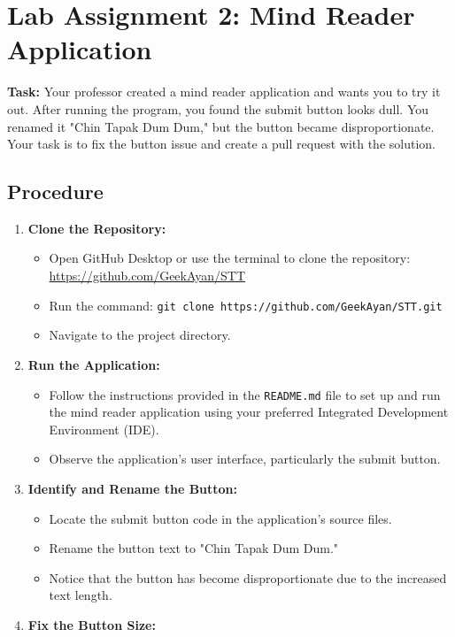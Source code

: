 \documentclass[a4paper,12pt]{article}
\begin{document}
\section{Lab Assignment 2: Mind Reader Application}

\textbf{Task:} Your professor created a mind reader application and wants you to try it out. After running the program, you found the submit button looks dull. You renamed it "Chin Tapak Dum Dum," but the button became disproportionate. Your task is to fix the button issue and create a pull request with the solution.

\subsection*{Procedure}
\begin{enumerate}[label=\arabic*.]
    \item \textbf{Clone the Repository:}
    \begin{itemize}
        \item Open GitHub Desktop or use the terminal to clone the repository: \url{https://github.com/GeekAyan/STT}
        \item Run the command: \texttt{git clone https://github.com/GeekAyan/STT.git}
        \item Navigate to the project directory.
    \end{itemize}
    \item \textbf{Run the Application:}
    \begin{itemize}
        \item Follow the instructions provided in the \texttt{README.md} file to set up and run the mind reader application using your preferred Integrated Development Environment (IDE).
        \item Observe the application's user interface, particularly the submit button.
    \end{itemize}
    \item \textbf{Identify and Rename the Button:}
    \begin{itemize}
        \item Locate the submit button code in the application’s source files.
        \item Rename the button text to "Chin Tapak Dum Dum."
        \item Notice that the button has become disproportionate due to the increased text length.
    \end{itemize}
    \item \textbf{Fix the Button Size:}

\end{enumerate}
\end{document}

